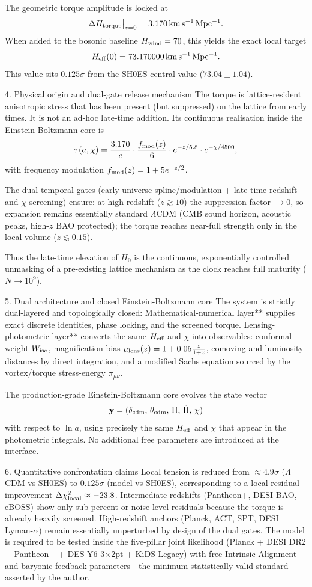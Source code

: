 The geometric torque amplitude is locked at
\[
\Delta H_{\rm torque}\big|_{z=0} = 3.170\,\mathrm{km\,s^{-1}\,Mpc^{-1}}.
\]
When added to the bosonic baseline \(H_{\rm wind} = 70\), this yields the exact local target
\[
H_{\rm eff}(0) = 73.170000\,\mathrm{km\,s^{-1}\,Mpc^{-1}}.
\]
This value sits \(0.125\sigma\) from the SH0ES central value (\(73.04 \pm 1.04\)).

4. Physical origin and dual-gate release mechanism
The torque is lattice-resident anisotropic stress that has been present (but suppressed) on the lattice from early times. It is not an ad-hoc late-time addition. Its continuous realisation inside the Einstein-Boltzmann core is
\[
\tau(a,\chi) = \frac{3.170}{c}\cdot\frac{f_{\rm mod}(z)}{6}\cdot e^{-z/5.8}\cdot e^{-\chi/4500},
\]
with frequency modulation \(f_{\rm mod}(z) = 1 + 5e^{-z/2}\).

The dual temporal gates (early-universe spline/modulation + late-time redshift and \(\chi\)-screening) ensure:
at high redshift (\(z \gtrsim 10\)) the suppression factor \(\to 0\), so expansion remains essentially standard \(\Lambda\)CDM (CMB sound horizon, acoustic peaks, high-\(z\) BAO protected);
the torque reaches near-full strength only in the local volume (\(z \lesssim 0.15\)).

Thus the late-time elevation of \(H_0\) is the continuous, exponentially controlled unmasking of a pre-existing lattice mechanism as the clock reaches full maturity (\(N\to 10^9\)).

5. Dual architecture and closed Einstein-Boltzmann core
The system is strictly dual-layered and topologically closed:
Mathematical-numerical layer** supplies exact discrete identities, phase locking, and the screened torque.
Lensing-photometric layer** converts the same \(H_{\rm eff}\) and \(\chi\) into observables: conformal weight \(W_{\rm iso}\), magnification bias \(\mu_{\rm lens}(z) = 1 + 0.05\frac{z}{1+z}\), comoving and luminosity distances by direct integration, and a modified Sachs equation sourced by the vortex/torque stress-energy \(\pi_{\mu\nu}\).

The production-grade Einstein-Boltzmann core evolves the state vector
\[
\mathbf{y} = (\delta_{\rm cdm},\,\theta_{\rm cdm},\,\Pi,\,\dot{\Pi},\,\chi)
\]
with respect to \(\ln a\), using precisely the same \(H_{\rm eff}\) and \(\chi\) that appear in the photometric integrals. No additional free parameters are introduced at the interface.

6. Quantitative confrontation claims
Local tension is reduced from \(\approx 4.9\sigma\) (\(\Lambda\)CDM vs SH0ES) to \(0.125\sigma\) (model vs SH0ES), corresponding to a local residual improvement \(\Delta\chi^2_{\rm local}\approx -23.8\).
Intermediate redshifts (Pantheon+, DESI BAO, eBOSS) show only sub-percent or noise-level residuals because the torque is already heavily screened.
High-redshift anchors (Planck, ACT, SPT, DESI Lyman-\(\alpha\)) remain essentially unperturbed by design of the dual gates.
The model is required to be tested inside the five-pillar joint likelihood (Planck + DESI DR2 + Pantheon+ + DES Y6 3\(\times\)2pt + KiDS-Legacy) with free Intrinsic Alignment and baryonic feedback parameters—the minimum statistically valid standard asserted by the author.

